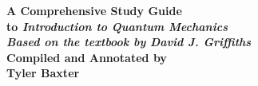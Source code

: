 \begin{titlepage}
    \newpage
    \thispagestyle{empty}
    \null
    \vfill

    \begin{center}

        \Huge\bfseries
        A Comprehensive Study Guide\\[1em]
        \Large\mdseries
        to \textit{Introduction to Quantum Mechanics}\\[2em]

        \normalsize
        \textit{Based on the textbook by David J. Griffiths}\\[4em]

        \large
        Compiled and Annotated by\\[0.5em]
        \textbf{Tyler Baxter}

    \end{center}

    \vfill
    \null
    \newpage
\end{titlepage}
